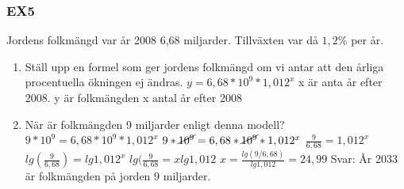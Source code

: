 \documentclass[a4paper,10pt]{article}
\begin{document}
\begin{flushleft}
\subsubsection{EX5}
  Jordens folkmängd var år 2008 6,68 miljarder. Tillväxten var då $ 1,2\% $ per år.
  \begin{enumerate}
    \item Ställ upp en formel som ger jordens folkmängd om vi antar att den årliga procentuella ökningen ej ändras.\newline
    $ y=6,68*10^9*1,012^x $\newline
    x är anta år efter 2008. y är folkmängden x antal år efter 2008
    \item När är folkmängden 9 miljarder enligt denna modell?\newline
    $ 9*10^9 = 6,68*10^9*1,012^x $\newline
    $ 9*\cancel{10^9} = 6,68*\cancel{10^9}*1,012^x $\newline
    $ \frac{9}{6,68} = 1,012^x $\newline
    $ lg(\frac{9}{6,68}) = lg1,012^x $\newline
    $ lg(\frac{9}{6,68} = xlg1,012 $\newline
    $ x = \frac{lg(9/6,68)}{lg1,012} = 24,99 $\newline
    Svar: År 2033 är folkmängden på jorden 9 miljarder.
  \end{enumerate}

\end{flushleft}
\end{document}
